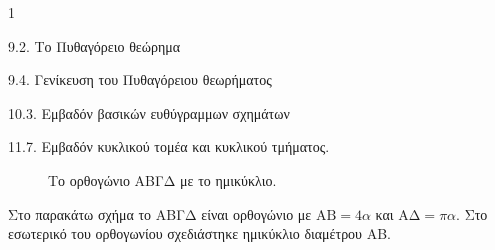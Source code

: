 \begin{ylh}{1}
    \item 9.2. Το Πυθαγόρειο θεώρημα
    \item 9.4. Γενίκευση του Πυθαγόρειου θεωρήματος
    \item 10.3. Εμβαδόν βασικών ευθύγραμμων σχημάτων
    \item 11.7. Εμβαδόν κυκλικού τομέα και κυκλικού τμήματος.
\end{ylh}
\begin{figure} %
\centering
{}
\caption{Το ορθογώνιο ABΓΔ με το ημικύκλιο.}
\end{figure}
Στο παρακάτω σχήμα το ΑΒΓΔ είναι ορθογώνιο με $\text{AB} = 4\alpha$ και $\text{AΔ} = \pi\alpha$. Στο εσωτερικό του ορθογωνίου σχεδιάστηκε ημικύκλιο διαμέτρου ΑΒ.
